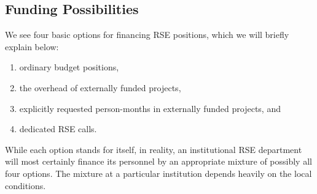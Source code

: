 \documentclass[a4paper]{article}
\begin{document}
\subsection{Funding Possibilities}
\label{sec:funding}

We see four basic options for financing RSE positions, which we will briefly explain below:
\begin{enumerate}
\item ordinary budget positions,
\item the overhead of externally funded projects,
\item explicitly requested person-months in externally funded projects, and
\item dedicated RSE calls.
\end{enumerate}
While each option stands for itself, in reality, an institutional RSE department will most certainly finance its personnel by an appropriate mixture of possibly all four options.
The mixture at a particular institution depends heavily on the local conditions.
\end{document}
